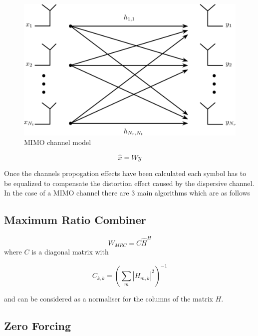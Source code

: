 \begin{figure}[H]
    \begin{center}
        \includegraphics[width=\linewidth]{images/MIMO_Illustration.jpg}
        \caption{MIMO channel model}
        \label{fig:MIMOChannel}
    \end{center}
\end{figure}

\begin{equation}
    \hat{x} = Wy
\end{equation}

Once the channels propogation effects have been calculated each symbol has to be equalized to compensate the distortion effect caused by the dispersive channel. In the case of a MIMO channel there are 3 main algorithms which are as follows

\subsection{Maximum Ratio Combiner}\label{ssec:Simple}

\begin{equation}
    W_{MRC} = C\hat{H}^H
\end{equation}
where $C$ is a diagonal matrix with 

\begin{equation}
    C_{k,k} = \left ( {\sum_{m}} \left | H_{m,k} \right |^2 \right )^{-1}
\end{equation}

and can be considered as a normaliser for the columns of the matrix $H$.

\subsection{Zero Forcing}\label{ssec:ZF}


